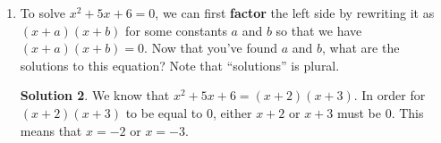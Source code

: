\documentclass{article}
\theoremstyle{definition}
\newtheorem*{solution}{Solution}
\begin{document}
\begin{enumerate}
\begin{enumerate}
            $b$.
            \begin{solution}
                In order for $(x + a)(x + b) = x^2 + (a + b)x + ab$ to be equal
                to $x^2 + 5x + 6$, $a + b$ must be $5$ and $ab$ must be $6$.
                This means that $a = 2$ and $b = 3$, or $a = 3$ and $b = 2$.
            \end{solution}
            \item To solve $x^2 + 5x + 6 = 0$, we can first \textbf{factor} the
            left side by rewriting it as $(x + a)(x + b)$ for some constants $a$
            and $b$ so that we have $(x + a)(x + b) = 0$. Now that you've found
            $a$ and $b$, what are the solutions to this equation? Note that
            ``solutions'' is plural.
            \begin{solution}
                We know that $x^2 + 5x + 6 = (x + 2)(x + 3)$. In order for $(x +
                2)(x + 3)$ to be equal to $0$, either $x + 2$ or $x + 3$ must be
                $0$. This means that $x = -2$ or $x = -3$.
            \end{solution}
        \end{enumerate}
    \end{enumerate}
\end{document}
